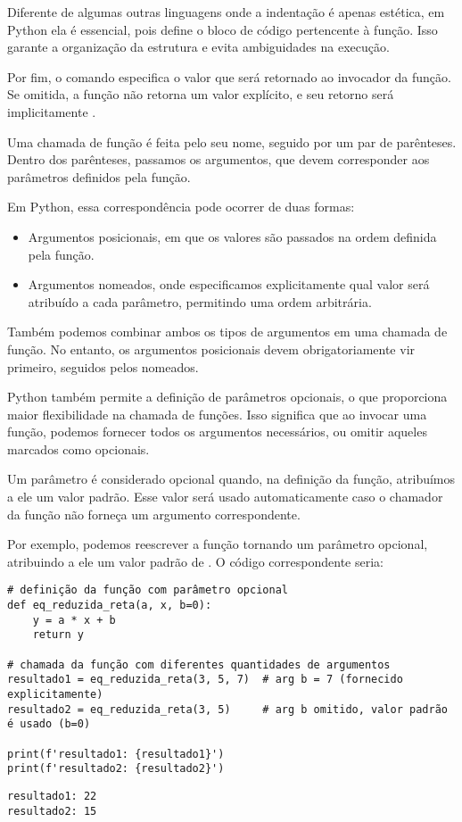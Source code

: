 Diferente de algumas outras linguagens onde a indentação é apenas estética, em Python ela é essencial, pois define
o bloco de código pertencente à função.
Isso garante a organização da estrutura e evita ambiguidades na execução.

Por fim, o comando  especifica o valor que será retornado ao invocador da função.
Se omitida, a função não retorna um valor explícito, e seu retorno será implicitamente .

Uma chamada de função é feita pelo seu nome, seguido por um par de parênteses.
Dentro dos parênteses, passamos os argumentos, que devem corresponder aos parâmetros definidos pela função.

Em Python, essa correspondência pode ocorrer de duas formas:
\begin{itemize}
\item Argumentos posicionais, em que os valores são passados na ordem definida pela função.
\item Argumentos nomeados, onde especificamos explicitamente qual valor será atribuído a cada parâmetro,
permitindo uma ordem arbitrária.
\end{itemize}

Também podemos combinar ambos os tipos de argumentos em uma chamada de função.
No entanto, os argumentos posicionais devem obrigatoriamente vir primeiro, seguidos pelos nomeados.

Python também permite a definição de parâmetros opcionais, o que proporciona maior flexibilidade na chamada de funções.
Isso significa que ao invocar uma função, podemos fornecer todos os argumentos necessários, ou omitir aqueles marcados
como opcionais.

Um parâmetro é considerado opcional quando, na definição da função, atribuímos a ele um valor padrão.
Esse valor será usado automaticamente caso o chamador da função não forneça um argumento correspondente.

Por exemplo, podemos reescrever a função  tornando  um parâmetro opcional,
atribuindo a ele um valor padrão de .
O código correspondente seria:
\begin{verbatim}
# definição da função com parâmetro opcional
def eq_reduzida_reta(a, x, b=0):
    y = a * x + b
    return y

# chamada da função com diferentes quantidades de argumentos
resultado1 = eq_reduzida_reta(3, 5, 7)  # arg b = 7 (fornecido explicitamente)
resultado2 = eq_reduzida_reta(3, 5)     # arg b omitido, valor padrão é usado (b=0)

print(f'resultado1: {resultado1}')
print(f'resultado2: {resultado2}')
\end{verbatim}
\begin{verbatim}
resultado1: 22
resultado2: 15
\end{verbatim}

